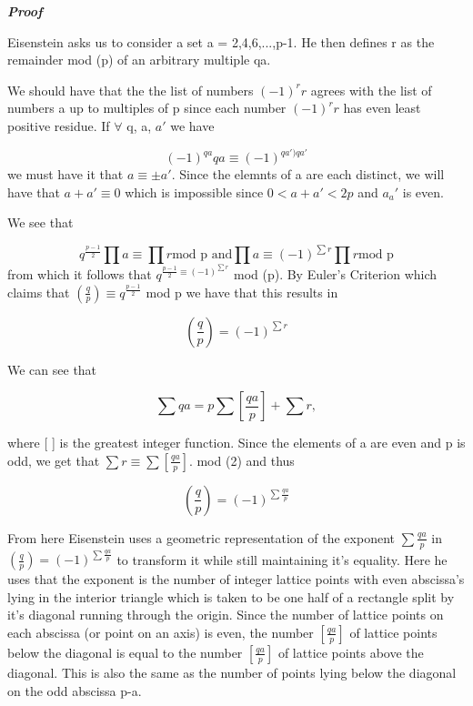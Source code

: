 \documentclass{article}
\begin{document}
\begin{spacing}{1.1}
\textbf{\textit{Proof}}

\vspace{3mm}

Eisenstein asks us to consider a set a = 2,4,6,...,p-1.  He then defines r as the remainder mod (p) of an arbitrary multiple qa.  

\vspace{3mm}

We should have that the the list of numbers $(-1)^rr$ agrees with the list of numbers a up to multiples of p since each number $(-1)^rr$ has even least positive residue.  If $\forall$ q, a, $a\prime$ we have 

\vspace{3mm}

$$ (-1)^{qa}qa \equiv (-1)^{qa\prime)qa\prime} $$
we must have it that $a \equiv \pm a\prime$.  Since the elemnts of a are each distinct, we will have that $a + a\prime \equiv 0$ which is impossible since $0 < a + a\prime < 2p$ and $a _ a\prime$ is even.  

\vspace{3mm}

We see that 

$$
q^{\frac{p-1}{2}}\prod a \equiv \prod r 
\text{mod p and}
\prod a \equiv (-1)^{\sum r} \prod r
\text{mod p}
$$
from which it follows that $q^{\frac{p-1}{2} \equiv (-1)^{\sum r}}$ mod (p).  By Euler's Criterion which claims that $(\frac{q}{p}) \equiv q^{\frac{p-1}{2}}$ mod p we have that this results in 

$$(\frac{q}{p}) = (-1)^{\sum r}
$$

We can see that

$$\sum qa = p \sum [\frac{qa}{p}] + \sum r,$$

where [ ] is the greatest integer function.  Since the elements of a are even and p is odd, we get that $\sum r \equiv \sum [\frac{qa}{p}].$ mod (2) and thus 

$$(\frac{q}{p}) = (-1)^{\sum \frac{qa}{p}}
$$

From here Eisenstein uses a geometric representation of the exponent $\sum \frac{qa}{p}$ in $(\frac{q}{p}) = (-1)^{\sum \frac{qa}{p}}
$ to transform it while still maintaining it's equality.  Here he uses that the exponent is the number of integer lattice points with even abscissa's lying in the interior triangle which is taken to be one half of a rectangle split by it's diagonal running through the origin.  Since the number of lattice points on each abscissa (or point on an axis) is even, the number $[\frac{qa}{p}]$ of lattice points below the diagonal is equal to the number  $[\frac{qa}{p}]$ of lattice points above the diagonal.  This is also the same as the number of points lying below the diagonal on the odd abscissa p-a.  


\end{spacing}
\end{document}
